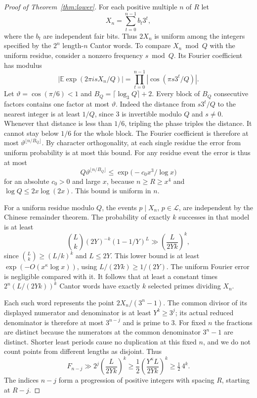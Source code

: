 \begin{proof}[Proof of Theorem~\ref{thm:lower}]
For each positive multiple \(n\) of \(R\) let
\[
 X_n=\sum_{t=0}^{n-1}b_t3^t,
\]
where the \(b_t\) are independent fair bits. Thus \(2X_n\) is
uniform among the integers specified by the \(2^n\) length-\(n\)
Cantor words. To compare \(X_n\bmod Q\) with the uniform residue,
consider a nonzero frequency \(s\bmod Q\). Its Fourier coefficient
has modulus
\[
 \left|\mathbb E\exp(2\pi i sX_n/Q)\right|
   =\prod_{t=0}^{n-1}|\cos(\pi s3^t/Q)|.
\]
Let \(\vartheta=\cos(\pi/6)<1\) and
\(B_Q=\lceil\log_3 Q\rceil+2\).
Every block of \(B_Q\) consecutive factors contains one factor at
most \(\vartheta\). Indeed the distance from \(s3^t/Q\) to the
nearest integer is at least \(1/Q\), since \(3\) is invertible
modulo \(Q\) and \(s\ne0\). Whenever that distance is less than
\(1/6\), tripling the phase triples the distance. It cannot stay
below \(1/6\) for the whole block. The Fourier coefficient is
therefore at most \(\vartheta^{\lfloor n/B_Q\rfloor}\).
By character orthogonality, at each single residue the error from
uniform probability is at most this bound. For any residue event
the error is thus at most
\[
 Q\vartheta^{\lfloor n/B_Q\rfloor}
 \le \exp\bigl(-c_0x^3/\log x\bigr)
\]
for an absolute \(c_0>0\) and large \(x\), because \(n\ge R\ge x^4\)
and \(\log Q\le 2x\log(2x)\). This bound is uniform in \(n\).

For a uniform residue modulo \(Q\), the events \(p\mid X_n\),
\(p\in\mathcal L\), are independent by the Chinese remainder
theorem. The probability of exactly \(k\) successes in that model
is at least
\[
 \binom Lk(2Y)^{-k}(1-1/Y)^L
   \gg \left(\frac{L}{2Yk}\right)^k,
\]
since \(\binom Lk\ge(L/k)^k\) and \(L\le2Y\).
This lower bound is at least \(\exp(-O(x^\kappa\log x))\),
using \(L/(2Yk)\ge1/(2Y)\). The uniform Fourier error is
negligible compared with it. It follows that at least
a constant times \(2^n(L/(2Yk))^k\) Cantor words have exactly
\(k\) selected primes dividing \(X_n\).

Each such word represents the point \(2X_n/(3^n-1)\).
The common divisor of its displayed numerator and denominator
is at least \(Y^k\ge3^j\); its actual reduced denominator is
therefore at most \(3^{n-j}\) and is prime to \(3\).
For fixed \(n\) the fractions are distinct because the numerators
at the common denominator \(3^n-1\) are distinct. Shorter least
periods cause no duplication at this fixed \(n\), and we do not
count points from different lengths as disjoint. Thus
\[
 F_{n-j}\gg 2^j\left(\frac{L}{2Yk}\right)^k
      \ge \frac12\left(\frac{Y^\kappa L}{2Yk}\right)^k
      \ge \tfrac12\,4^k .
\]
The indices \(n-j\) form a progression of positive integers with
spacing \(R\), starting at \(R-j\).


\end{proof}
